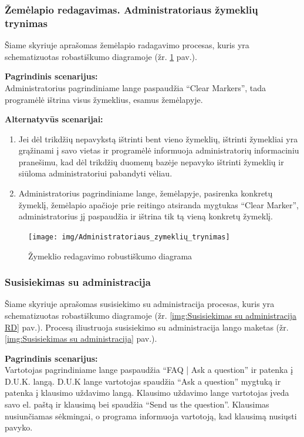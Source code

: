 \documentclass{VUMIFPSkursinis}
\begin{document}
\subsubsection{Žemėlapio redagavimas. Administratoriaus žymeklių trynimas}
	Šiame skyriuje aprašomas žemėlapio radagavimo procesas, kuris yra schematizuotas robastiškumo diagramoje (žr. \ref{img:Žymeklio radagavimo langas} pav.).

	\textbf{Pagrindinis scenarijus:}\\
	Administratorius pagrindiniame lange paspaudžia “Clear Markers”, tada programėlė ištrina visus žymeklius, esamus žemėlapyje.

	\textbf{Alternatyvūs scenarijai:}
	\begin{enumerate}[itemsep=-2mm]
		\item Jei dėl trikdžių nepavykstą ištrinti bent vieno žymeklių, ištrinti žymekliai yra grąžinami į savo vietas ir programėlė informuoja administratorių informaciniu pranešimu, kad dėl trikdžių duomenų bazėje nepavyko ištrinti žymeklių ir siūloma administratoriui pabandyti vėliau.
		\item Administratorius pagrindiniame lange, žemėlapyje, pasirenka konkretų žymeklį, žemėlapio apačioje prie reitingo atsiranda mygtukas “Clear Marker”, administratorius jį paspaudžia ir ištrina tik tą vieną konkretų žymeklį.
	\end{enumerate} 
		\begin{figure}[H]
				\centering
				\texttt{[image: img/Administratoriaus\_zymeklių\_trynimas]}
				\caption{Žymeklio redagavimo robustiškumo diagrama}
				\label{img:Žymeklio radagavimo langas}
			\end{figure}

\subsubsection{Susisiekimas su administracija}
	Šiame skyriuje aprašomas susisiekimo su administracija procesas, kuris yra schematizuotas robastiškumo diagramoje (žr. \ref{img:Susisiekimas su administracija RD} pav.). 
	Procesą iliustruoja susisiekimo su administracija lango maketas (žr. \ref{img:Susisiekimas su administracija} pav.).

	\textbf{Pagrindinis scenarijus:}\\
	Vartotojas pagrindiniame lange paspaudžia “FAQ | Ask a question” ir patenka į D.U.K. langą. D.U.K lange vartotojas 
	spaudžia “Ask a question” mygtuką ir patenka į klausimo uždavimo langą. Klausimo uždavimo lange vartotojas įveda 
	savo el. paštą ir klausimą bei spaudžia “Send us the question”. Klausimas nusiunčiamas sėkmingai, o programa informuoja 
	vartotoją, kad klausimą nusiųsti pavyko.
\end{document}
